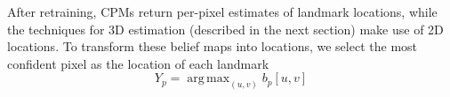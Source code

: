 \documentclass[10pt,twocolumn,letterpaper]{article}
\DeclareMathOperator*{\argmax}{arg\,max}
\begin{document}
After retraining, CPMs return per-pixel estimates of landmark locations, while
the techniques for 3D estimation (described in the next section) make use of 2D
locations. To transform these belief maps into locations, we select the most
confident pixel as the location of each landmark
\begin{equation}
  Y_p=\argmax_{(u,v)}b_{p}[u,v]
\end{equation}
\end{document}
